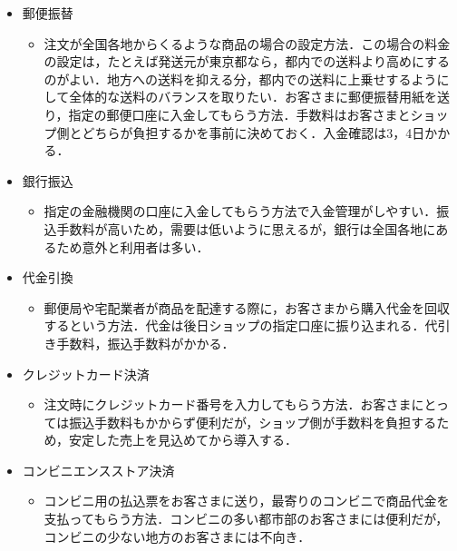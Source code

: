 \begin{itemize}

 \item	郵便振替

\begin{itemize}
\setlength{\parskip}{3mm}

 \item	注文が全国各地からくるような商品の場合の設定方法．この場合の料金の設定は，たとえば発送元が東京都なら，都内での送料より高めにするのがよい．地方への送料を抑える分，都内での送料に上乗せするようにして全体的な送料のバランスを取りたい．お客さまに郵便振替用紙を送り，指定の郵便口座に入金してもらう方法．手数料はお客さまとショップ側とどちらが負担するかを事前に決めておく．入金確認は3，4日かかる．

\end{itemize}

 \item	銀行振込

\begin{itemize}
\setlength{\parskip}{3mm}
 \item	指定の金融機関の口座に入金してもらう方法で入金管理がしやすい．振込手数料が高いため，需要は低いように思えるが，銀行は全国各地にあるため意外と利用者は多い．

\end{itemize}

 \item	代金引換

\begin{itemize}
\setlength{\parskip}{3mm}

 \item	郵便局や宅配業者が商品を配達する際に，お客さまから購入代金を回収するという方法．代金は後日ショップの指定口座に振り込まれる．代引き手数料，振込手数料がかかる．

\end{itemize}

 \item	クレジットカード決済

\begin{itemize}
\setlength{\parskip}{3mm}

 \item	注文時にクレジットカード番号を入力してもらう方法．お客さまにとっては振込手数料もかからず便利だが，ショップ側が手数料を負担するため，安定した売上を見込めてから導入する．
\end{itemize}

 \item	コンビニエンスストア決済

\begin{itemize}
\setlength{\parskip}{3mm}
 \item	コンビニ用の払込票をお客さまに送り，最寄りのコンビニで商品代金を支払ってもらう方法．コンビニの多い都市部のお客さまには便利だが，コンビニの少ない地方のお客さまには不向き．

\end{itemize}
\end{itemize}


